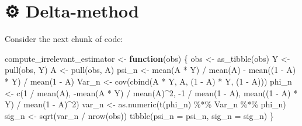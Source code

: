 \documentclass[
  11pt,
  openright,twoside]{book}
\newenvironment{Shaded}{\begin{snugshade}}{\end{snugshade}}
\newcommand{\AttributeTok}[1]{\textcolor[rgb]{0.77,0.63,0.00}{#1}}
\newcommand{\ControlFlowTok}[1]{\textcolor[rgb]{0.13,0.29,0.53}{\textbf{#1}}}
\newcommand{\DecValTok}[1]{\textcolor[rgb]{0.00,0.00,0.81}{#1}}
\newcommand{\FunctionTok}[1]{\textcolor[rgb]{0.00,0.00,0.00}{#1}}
\newcommand{\NormalTok}[1]{#1}
\newcommand{\OtherTok}[1]{\textcolor[rgb]{0.56,0.35,0.01}{#1}}
\newcommand{\SpecialCharTok}[1]{\textcolor[rgb]{0.00,0.00,0.00}{#1}}
\newcommand{\gear}{\usebox{\gearbox}\;}
\theoremstyle{definition}
\theoremstyle{definition}
\theoremstyle{definition}
\theoremstyle{definition}
\theoremstyle{remark}
\begin{document}
\hypertarget{delta-method}{%
\section{\texorpdfstring{⚙ \gear Delta-method}{⚙ Delta-method}}\label{delta-method}}

Consider the next chunk of code:

\begin{Shaded}
\begin{Highlighting}[]
\NormalTok{compute\_irrelevant\_estimator }\OtherTok{\textless{}{-}} \ControlFlowTok{function}\NormalTok{(obs) \{}
\NormalTok{  obs }\OtherTok{\textless{}{-}} \FunctionTok{as\_tibble}\NormalTok{(obs)}
\NormalTok{  Y }\OtherTok{\textless{}{-}} \FunctionTok{pull}\NormalTok{(obs, Y)}
\NormalTok{  A }\OtherTok{\textless{}{-}} \FunctionTok{pull}\NormalTok{(obs, A)}
\NormalTok{  psi\_n }\OtherTok{\textless{}{-}} \FunctionTok{mean}\NormalTok{(A }\SpecialCharTok{*}\NormalTok{ Y) }\SpecialCharTok{/} \FunctionTok{mean}\NormalTok{(A) }\SpecialCharTok{{-}} \FunctionTok{mean}\NormalTok{((}\DecValTok{1} \SpecialCharTok{{-}}\NormalTok{ A) }\SpecialCharTok{*}\NormalTok{ Y) }\SpecialCharTok{/} \FunctionTok{mean}\NormalTok{(}\DecValTok{1} \SpecialCharTok{{-}}\NormalTok{ A)}
\NormalTok{  Var\_n }\OtherTok{\textless{}{-}} \FunctionTok{cov}\NormalTok{(}\FunctionTok{cbind}\NormalTok{(A }\SpecialCharTok{*}\NormalTok{ Y, A, (}\DecValTok{1} \SpecialCharTok{{-}}\NormalTok{ A) }\SpecialCharTok{*}\NormalTok{ Y, (}\DecValTok{1} \SpecialCharTok{{-}}\NormalTok{ A)))}
\NormalTok{  phi\_n }\OtherTok{\textless{}{-}} \FunctionTok{c}\NormalTok{(}\DecValTok{1} \SpecialCharTok{/} \FunctionTok{mean}\NormalTok{(A), }\SpecialCharTok{{-}}\FunctionTok{mean}\NormalTok{(A }\SpecialCharTok{*}\NormalTok{ Y) }\SpecialCharTok{/} \FunctionTok{mean}\NormalTok{(A)}\SpecialCharTok{\^{}}\DecValTok{2}\NormalTok{,}
             \SpecialCharTok{{-}}\DecValTok{1} \SpecialCharTok{/} \FunctionTok{mean}\NormalTok{(}\DecValTok{1} \SpecialCharTok{{-}}\NormalTok{ A),}
             \FunctionTok{mean}\NormalTok{((}\DecValTok{1} \SpecialCharTok{{-}}\NormalTok{ A) }\SpecialCharTok{*}\NormalTok{ Y) }\SpecialCharTok{/} \FunctionTok{mean}\NormalTok{(}\DecValTok{1} \SpecialCharTok{{-}}\NormalTok{ A)}\SpecialCharTok{\^{}}\DecValTok{2}\NormalTok{)}
\NormalTok{  var\_n }\OtherTok{\textless{}{-}} \FunctionTok{as.numeric}\NormalTok{(}\FunctionTok{t}\NormalTok{(phi\_n) }\SpecialCharTok{\%*\%}\NormalTok{ Var\_n }\SpecialCharTok{\%*\%}\NormalTok{ phi\_n)}
\NormalTok{  sig\_n }\OtherTok{\textless{}{-}} \FunctionTok{sqrt}\NormalTok{(var\_n }\SpecialCharTok{/} \FunctionTok{nrow}\NormalTok{(obs))}
  \FunctionTok{tibble}\NormalTok{(}\AttributeTok{psi\_n =}\NormalTok{ psi\_n, }\AttributeTok{sig\_n =}\NormalTok{ sig\_n)}
\NormalTok{\}}
\end{Highlighting}
\end{Shaded}
\end{document}
